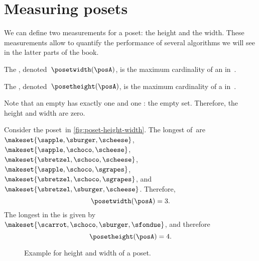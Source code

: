 
\section{Measuring posets}
We can define two measurements for a poset: the height and the width.
These measurements allow to quantify the performance of several algorithms we will see in the latter parts of the book.
\begin{definition}
    \label{def:poset-width}
    The , denoted~$\posetwidth(\posA)$, is the maximum cardinality of an  in~\posA.
\end{definition}

\begin{definition}
    \label{def:poset-height}
    The , denoted~$\posetheight(\posA)$, is the maximum cardinality of a  in~\posA.
\end{definition}

Note that an empty  has exactly one  and one : the empty set.
Therefore, the height and width are zero.

\begin{example}
    Consider the poset~\posA in \cref{fig:poset-height-width}.
    The longest  of~\posA are~$\makeset{\sapple, \sburger, \scheese}$, $\makeset{\sapple, \schoco, \scheese}$, $\makeset{\sbretzel, \schoco, \scheese}$, $\makeset{\sapple, \schoco, \sgrapes}$, $\makeset{\sbretzel, \schoco, \sgrapes}$, and~$\makeset{\sbretzel, \sburger, \scheese}$.
    Therefore,
    \begin{equation}\label{eq:poset-height-width-1}
        \posetwidth(\posA)=3.
    \end{equation}
    The longest  in the  is given by~$\makeset{\scarrot,\schoco,\sburger,\sfondue}$, and therefore
    \begin{equation}\label{eq:poset-height-width-2}
        \posetheight(\posA)=4.
    \end{equation}
\end{example}

\begin{figure*}[h]
    \caption{Example for height and width of a poset.
    }
\end{figure*}

